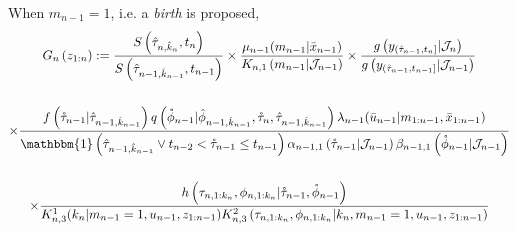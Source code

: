 \documentclass[12pt,a4paper]{article}
\begin{document}
When $m_{n-1} = 1$, i.e. a \textit{birth} is proposed, 
\begin{multline}
    \label{BlockVRPF_SMC_Incremental Weight_Birth}
    G_{n}\left(z_{1:n}\right) := \frac{S\left(\hat{\tau}_{n,\hat{k}_n},t_n\right)}{S\left(\hat{\tau}_{n-1,\hat{k}_{n-1}},t_{n-1}\right)} \times \frac{\mu_{n-1}(m_{n-1}|\bar{x}_{n-1})}{K_{n,1}\left(m_{n-1}|\mathcal{J}_{n-1}\right)}\times \frac{g\left(y_{(\mathring{\tau}_{n-1},t_n]}|\mathcal{J}_n\right)}{g\left(y_{(\mathring{\tau}_{n-1},t_{n-1}]}|\mathcal{J}_{n-1}\right)}\\\\
    \times \frac{f\left(\mathring{\tau}_{n-1}|\hat{\tau}_{n-1,\hat{k}_{n-1}}\right)q\left(\mathring{\phi}_{n-1}|\hat{\phi}_{n-1,\hat{k}_{n-1}},\mathring{\tau}_{n},\hat{\tau}_{n-1,\hat{k}_{n-1}}\right)\lambda_{n-1}(\bar{u}_{n-1}|m_{1:n-1},\bar{x}_{1:n-1})}{\mathbbm{1}\left(\hat{\tau}_{n-1,\hat{k}_{n-1}} \vee t_{n-2}  < \mathring{\tau}_{n-1} \leq t_{n-1} \right)\alpha_{n-1,1}\left(\mathring{\tau}_{n-1}|\mathcal{J}_{n-1}\right)\beta_{n-1,1}\left(\mathring{\phi}_{n-1}|\mathcal{J}_{n-1}\right)}\\\\
    \times \frac{h\left(\tau_{n,1:k_n},\phi_{n,1:k_n}|\mathring{\tau}_{n-1},\mathring{\phi}_{n-1}\right)}{K_{n,3}^1(k_n|m_{n-1}=1,u_{n-1},z_{1:n-1})K_{n,3}^{2}\left(\tau_{n,1:k_n},\phi_{n,1:k_n}|k_n,m_{n-1}=1,u_{n-1},z_{1:n-1}\right)}
\end{multline}
\end{document}

